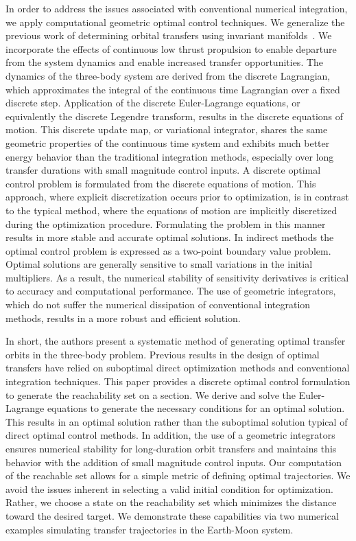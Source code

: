 \documentclass[preprint]{elsarticle}
\begin{document}
In order to address the issues associated with conventional numerical integration, we apply computational geometric optimal control techniques. 
We generalize the previous work of determining orbital transfers using invariant manifolds~\cite{koon2011}.
We incorporate the effects of continuous low thrust propulsion to enable departure from the system dynamics and enable increased transfer opportunities.
The dynamics of the three-body system are derived from the discrete Lagrangian, which approximates the integral of the continuous time Lagrangian over a fixed discrete step.
Application of the discrete Euler-Lagrange equations, or equivalently the discrete Legendre transform, results in the discrete equations of motion.
This discrete update map, or variational integrator, shares the same geometric properties of the continuous time system and exhibits much better energy behavior than the traditional integration methods, especially over long transfer durations with small magnitude control inputs.
A discrete optimal control problem is formulated from the discrete equations of motion.
This approach, where explicit discretization occurs prior to optimization,  is in contrast to the typical method, where the equations of motion are implicitly discretized during the optimization procedure.
Formulating the problem in this manner results in more stable and accurate optimal solutions. 
In indirect methods the optimal control problem is expressed as a two-point boundary value problem.
Optimal solutions are generally sensitive to small variations in the initial multipliers.
As a result, the numerical stability of sensitivity derivatives is critical to accuracy and computational performance. 
The use of geometric integrators, which do not suffer the numerical dissipation of conventional integration methods, results in a more robust and efficient solution.



In short, the authors present a systematic method of generating optimal transfer orbits in the three-body problem.
Previous results in the design of optimal transfers have relied on suboptimal direct optimization methods and conventional integration techniques.
This paper provides a discrete optimal control formulation to generate the reachability set on a \Poincare section.
We derive and solve the Euler-Lagrange equations to generate the necessary conditions for an optimal solution.
This results in an optimal solution rather than the suboptimal solution typical of direct optimal control methods.
In addition, the use of a geometric integrators ensures numerical stability for long-duration orbit transfers and maintains this behavior with the addition of small magnitude control inputs.
Our computation of the reachable set allows for a simple metric of defining optimal trajectories.
We avoid the issues inherent in selecting a valid initial condition for optimization.
Rather, we choose a state on the reachability set which minimizes the distance toward the desired target.
We demonstrate these capabilities via two numerical examples simulating transfer trajectories in the Earth-Moon system.
\end{document}
